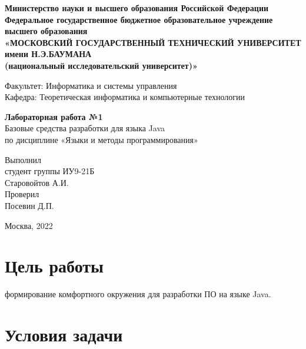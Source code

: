 \documentclass[12pt,a4paper,oneside,titlepage]{article}
\begin{document}
\begin{center}
  \hfill \break
  \textbf{
    \footnotesize{Министерство науки и высшего образования Российской Федерации}\\
    \hfill \break
    \footnotesize{Федеральное государственное бюджетное образовательное учреждение высшего образования}\\
    \small{«МОСКОВСКИЙ ГОСУДАРСТВЕННЫЙ ТЕХНИЧЕСКИЙ УНИВЕРСИТЕТ имени Н.Э.БАУМАНА\\(национальный исследовательский университет)»}}\\
\end{center}
\hfill \break
\normalsize{Факультет: Информатика и системы управления}\\
\hfill \break
\normalsize{Кафедра: Теоретическая информатика и компьютерные технологии}\\
\hfill\break
\begin{center}
  \textbf{\large{Лабораторная работа №1}}\\
  \large{Базовые средства разработки для языка Java\\
    по дисциплине «Языки и методы программирования»}\\
\end{center}
\hfill \break
\hfill \break
\hfill \break
\begin{flushright}
  \normalsize{
    Выполнил\\
    студент группы ИУ9-21Б\\
    Старовойтов А.И.\\
  }
  \normalsize{
    Проверил\\
    Посевин Д.П.
  }
\end{flushright}
\hfill \break
\hfill \break
\hfill \break
\hfill \break
\hfill \break
\hfill \break
\hfill \break
\hfill \break

\begin{center} Москва, 2022 \end{center}
\thispagestyle{empty} %

\author{Старовойтов Александр}

\section{Цель работы}

формирование комфортного окружения для
разработки ПО на языке Java.

\section{Условия задачи}
\end{document}
